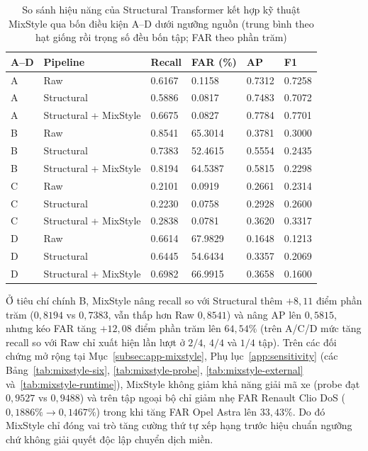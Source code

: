 \documentclass[12pt, a4paper, reqno, oneside]{book}
\begin{document}
{\renewcommand{\arraystretch}{0.85}
\begin{table}[htbp]\centering\footnotesize
\caption[Hiệu năng kết hợp MixStyle qua bốn điều kiện A--D dưới ngưỡng nguồn]{So sánh hiệu năng của Structural Transformer kết hợp kỹ thuật MixStyle qua bốn điều kiện A--D dưới ngưỡng nguồn (trung bình theo hạt giống rồi trọng số đều bốn tập; FAR theo phần trăm)}\label{tab:mixstyle-ad}
\begin{tabular}{P{1cm}P{4.3cm}P{1.6cm}P{2cm}P{1.5cm}P{1.5cm}}
\toprule
A--D & Pipeline & Recall & FAR (\%) & AP & F1\\\midrule
A & Raw & 0.6167 & 0.1158 & 0.7312 & 0.7258\\
A & Structural & 0.5886 & 0.0817 & 0.7483 & 0.7072\\
A & Structural + MixStyle & 0.6675 & 0.0827 & 0.7784 & 0.7701\\
B & Raw & 0.8541 & 65.3014 & 0.3781 & 0.3000\\
B & Structural & 0.7383 & 52.4615 & 0.5554 & 0.2435\\
B & Structural + MixStyle & 0.8194 & 64.5387 & 0.5815 & 0.2298\\
C & Raw & 0.2101 & 0.0919 & 0.2661 & 0.2314\\
C & Structural & 0.2230 & 0.0758 & 0.2928 & 0.2600\\
C & Structural + MixStyle & 0.2838 & 0.0781 & 0.3620 & 0.3317\\
D & Raw & 0.6614 & 67.9829 & 0.1648 & 0.1213\\
D & Structural & 0.6445 & 54.6434 & 0.3357 & 0.2069\\
D & Structural + MixStyle & 0.6982 & 66.9915 & 0.3658 & 0.1600\\
\bottomrule\end{tabular}
\end{table}}

Ở tiêu chí chính B, MixStyle nâng recall so với Structural thêm $+8{,}11$ điểm phần trăm ($0{,}8194$ vs $0{,}7383$, vẫn thấp hơn Raw $0{,}8541$) và nâng AP lên $0{,}5815$, nhưng kéo FAR tăng $+12{,}08$ điểm phần trăm lên $64{,}54\%$ (trên A/C/D mức tăng recall so với Raw chỉ xuất hiện lần lượt ở $2/4$, $4/4$ và $1/4$ tập). Trên các đối chứng mở rộng tại Mục~\ref{subsec:app-mixstyle}, Phụ lục~\ref{app:sensitivity} (các Bảng~\ref{tab:mixstyle-six}, \ref{tab:mixstyle-probe}, \ref{tab:mixstyle-external} và~\ref{tab:mixstyle-runtime}), MixStyle không giảm khả năng giải mã xe (probe đạt $0{,}9527$ vs $0{,}9488$) và trên tập ngoại bộ chỉ giảm nhẹ FAR Renault Clio DoS ($0{,}1886\% \to 0{,}1467\%$) trong khi tăng FAR Opel Astra lên $33{,}43\%$. Do đó MixStyle chỉ đóng vai trò tăng cường thứ tự xếp hạng trước hiệu chuẩn ngưỡng chứ không giải quyết độc lập chuyển dịch miền.
\end{document}

